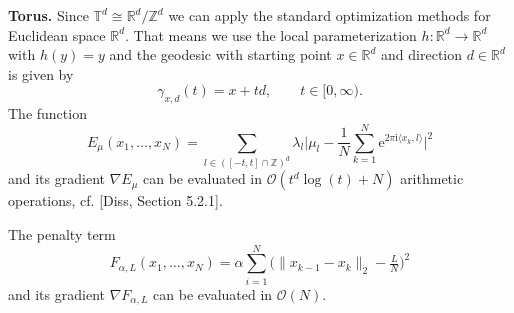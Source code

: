 \documentclass[%
a4paper,11pt,DIV=11,%
abstract=on%
]{scrartcl}
\begin{document}
\textbf{Torus.}
Since $\mathbb T^{d} \cong \mathbb R^{d} / \mathbb Z^{d}$  we can apply the standard optimization methods for Euclidean space $\mathbb R^{d}$. That means we use the local parameterization $h:\mathbb R^{d} \to \mathbb R^{d}$ with $h(y) = y$ and the geodesic with starting point $x \in \mathbb R^{d}$ and direction $d \in \mathbb R^{d}$ is given by
\[
  \gamma_{x,d}(t) = x + t d,  \qquad t \in [0,\infty).
\]
The function
\[
  E_{\mu}(x_{1},\dots,x_{N}) = \sum_{l \in ([-t,t] \cap \mathbb Z)^{d}} \lambda_{l} \Big| \mu_{l} - \frac 1N \sum_{k=1}^{N} \mathrm{e}^{2\pi \mathrm i \langle x_{k}, l\rangle  }\Big|^{2}
\]
and its gradient $\nabla E_{\mu}$
can be evaluated in $\mathcal O(t^{d} \log(t) + N)$ arithmetic operations, cf. {\color{blue}[Diss, Section 5.2.1]}.

The penalty term
\[
  F_{\alpha,L}(x_{1},\dots,x_{N}) = \alpha \sum_{i=1}^{N}  \big(\|x_{k-1}-x_{k}\|_{2} - \tfrac{L}{N}\big)^{2}
\]
and its gradient $\nabla F_{\alpha,L}$ 
can be evaluated in $\mathcal O(N)$.
\end{document}
